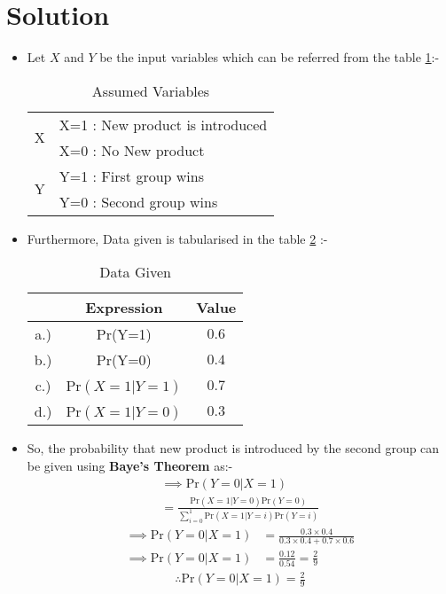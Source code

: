 \documentclass[journal,12pt,twocolumn]{IEEEtran}
\begin{document}
\section{Solution}
\begin{itemize}
\item Let $X$ and $Y$ be the input variables which can be referred from the table \ref{tab:table1}:-
\begin{table}[ht!]
\begin{center}
\begin{tabular}{|l|l|}
\hline
\multirow{2}{*}{X} & X=1 : New product is introduced \\ \cline{2-2} 
                   & X=0 : No New product \\ \hline
\multirow{2}{*}{Y} & Y=1 :  First group wins            \\ \cline{2-2} 
                   & Y=0 : Second group wins \\ \hline
\end{tabular}
\end{center}
\caption{Assumed Variables}
\label{tab:table1}
\end{table} 
\item Furthermore, Data given is tabularised in the table \ref{tab:table2} :-
\begin{table}[ht!]
\begin{center}
\begin{tabular}{|c|c|c|}
\hline
 &Expression & Value \\
\hline 
a.)&Pr(Y=1) & $0.6$ \\ 
\hline 
b.)&Pr(Y=0) & $0.4$ \\ 
\hline 
c.)&Pr$(X=1|Y=1)$ & $0.7$ \\ 
\hline 
d.)&Pr$(X=1|Y=0)$ & $0.3$ \\ 
\hline 
\end{tabular}
\end{center}
\caption{Data Given}
\label{tab:table2}
\end{table}
\item So, the probability that new product is introduced by the second group can be given using \textbf{Baye's Theorem} as:-
\begin{multline}
  \implies  \text{Pr}(Y=0|X=1)
    \\
   = \frac{\text{Pr}(X=1|Y=0)\text{Pr}(Y=0)}{ \sum_{i=0}^{1}\text{Pr}(X=1|Y=i)\text{Pr}(Y=i)}
    \end{multline}
\begin{align}
 \implies  \text{Pr}(Y=0|X=1)  &= \frac{0.3\times 0.4}{0.3\times0.4+0.7 \times 0.6 }
    \\
 \implies  \text{Pr}(Y=0|X=1) &= \frac{0.12}{0.54} =\frac{2}{9} 
\end{align}
\begin{align}
   \boxed{\therefore \text{Pr}(Y=0|X=1)= \frac{2}{9}}
\end{align}
\end{itemize}
\end{document}
